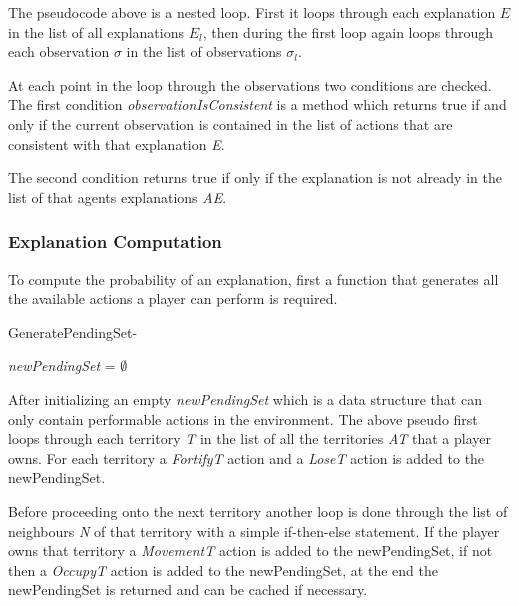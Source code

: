 \documentclass[parskip]{cs4rep}
\begin{document}
The pseudocode above is a nested loop. First it loops through each explanation $E$ in the list of all explanations $E_l$, then during the first loop again loops through each observation $\sigma$ in the list of observations $\sigma_l$. 

At each point in the loop through the observations two conditions are checked. The first condition \textit{observationIsConsistent} is a method which  returns true if and only if the current observation is contained in the list of actions that are consistent with that explanation \textit{E}. 

The second condition returns true if only if the explanation is not already in the list of that agents explanations \textit{AE}.

\subsubsection{Explanation Computation}

To compute the probability of an explanation, first a function that generates all the available actions a player can perform is required.

\begin{pseudocode}{GeneratePendingSet}{-}
\begin{algorithm}[H]
\textit{newPendingSet} = $\emptyset$

\end{algorithm}
\end{pseudocode}

After initializing an empty \textit{newPendingSet} which is a data structure that can only contain performable actions in the environment. The above pseudo first loops through each territory \textit{T} in the list of all the territories \textit{AT} that a player owns. For each territory a \textit{FortifyT} action and a \textit{LoseT} action is added to the newPendingSet. 

Before proceeding onto the next territory another loop is done through the list of neighbours \textit{N} of that territory with a simple if-then-else statement. If the player owns that territory a \textit{MovementT} action is added to the newPendingSet, if not then a \textit{OccupyT} action is added to the newPendingSet, at the end the newPendingSet is returned and can be cached if necessary.
\end{document}

